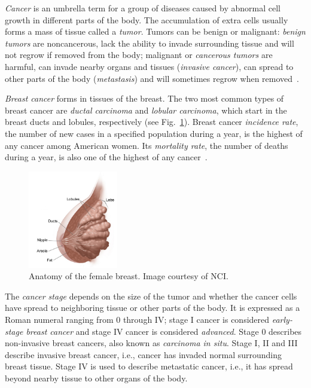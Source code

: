 \emph{Cancer} is an umbrella term for a group of diseases caused by abnormal cell growth in different parts of the body. The accumulation of extra cells usually forms a mass of tissue called a \emph{tumor}. Tumors can be benign or malignant: \emph{benign tumors} are noncancerous, lack the ability to invade surrounding tissue and will not regrow if removed from the body;  malignant or \emph{cancerous tumors} are harmful, can invade nearby organs and tissues (\emph{invasive cancer}), can spread to other parts of the body (\emph{metastasis}) and will sometimes regrow when removed~\cite{WYNTKABreastCancer2012}.

\emph{Breast cancer} forms in tissues of the breast. The two most common types of breast cancer are \emph{ductal carcinoma} and \emph{lobular carcinoma}, which start in the breast ducts and lobules, respectively (see Fig.~\ref{fig:BreastAnatomy}). Breast cancer \emph{incidence rate}, the number of new cases in a specified population during a year, is the highest of any cancer among American women. Its \emph{mortality rate}, the number of deaths during a year, is also one of the highest of any cancer~\cite{Howlader2014}.

\begin{figure}[h]
	\centering
	\includegraphics[width = 0.35\textwidth]{plots/breastAnatomy.png}
	\caption[Female Breast Anatomy]{Anatomy of the female breast. Image courtesy of NCI.}
	\label{fig:BreastAnatomy}
\end{figure}

The \emph{cancer stage} depends on the size of the tumor and whether the cancer cells have spread to neighboring tissue or other parts of the body. It is expressed as a Roman numeral ranging from 0 through IV; stage I cancer is considered \emph{early-stage breast cancer} and stage IV cancer is considered \emph{advanced}. Stage 0 describes non-invasive breast cancers, also known as \emph{carcinoma in situ}. Stage I, II and III describe invasive breast cancer, i.e., cancer has invaded normal surrounding breast tissue. Stage IV is used to describe metastatic cancer, i.e., it has spread beyond nearby tissue to other organs of the body.

